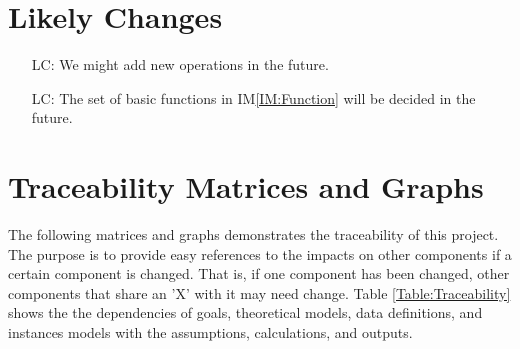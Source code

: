 \documentclass[12pt]{article}
\newcommand{\iref}[1]{IM\ref{#1}}
\newcounter{lcnum} %
\begin{document}
\section{Likely Changes}\label{Sc:LC}    
\noindent \begin{itemize}
\item[LC\refstepcounter{lcnum}\thelcnum\label{LC:NewOperation}:] 
We might add new operations in the future.
\item[LC\refstepcounter{lcnum}\thelcnum\label{LC:BasicFunction}:] 
The set of basic functions in \iref{IM:Function} will be 
decided in the future.
\end{itemize}

\section{Traceability Matrices and Graphs}\label{Sc:Trace}
The following matrices and graphs demonstrates the traceability 
of this project. The purpose is to provide easy references 
to the impacts on other components if a certain component is changed. 
That is, if one component has been changed, other components that share 
an 'X' with it may need change. Table \ref{Table:Traceability} 
shows the the dependencies of goals, theoretical models, 
data definitions, and instances models with the assumptions, 
calculations, and outputs.
\end{document}
